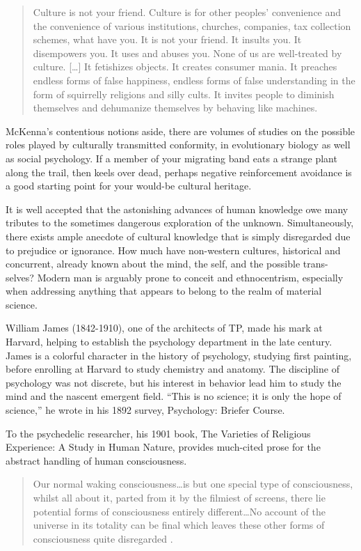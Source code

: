 \documentclass{UIdahoMastersThesis}
\begin{document}
\begin{quote}
{Culture is not your friend. Culture is for other peoples' convenience and the convenience of various institutions, churches, companies, tax collection schemes, what have you. It is not your friend. It insults you. It disempowers you. It uses and abuses you. None of us are well-treated by culture. [\ldots] It fetishizes objects. It creates consumer mania. It preaches endless forms of false happiness, endless forms of false understanding in the form of squirrelly religions and silly cults. It invites people to diminish themselves and dehumanize themselves by behaving like machines.}
\end{quote}

McKenna's contentious notions aside, there are volumes of studies on the possible roles played by culturally transmitted conformity, in evolutionary biology as well as social psychology. If a member of your migrating band eats a strange plant along the trail, then keels over dead, perhaps negative reinforcement avoidance is a good starting point for your would-be cultural heritage.

It is well accepted that the astonishing advances of human knowledge owe many tributes to the sometimes dangerous exploration of the unknown. Simultaneously, there exists ample anecdote of cultural knowledge that is simply disregarded due to prejudice or ignorance. How much have non-western cultures, historical and concurrent, already known about the mind, the self, and the possible trans-selves? Modern man is arguably prone to conceit and ethnocentrism, especially when addressing anything that appears to belong to the realm of material science.

William James (1842-1910), one of the architects of TP, made his mark at Harvard, helping to establish the psychology department in the late  century. James is a colorful character in the history of psychology, studying first painting, before enrolling at Harvard to study chemistry and anatomy. The discipline of psychology was not discrete, but his interest in behavior lead him to study the mind and the nascent emergent field. \enquote{This is no science; it is only the hope of science,} he wrote in his 1892 survey, Psychology: Briefer Course. 

To the psychedelic researcher, his 1901 book, The Varieties of Religious Experience: A Study in Human Nature, provides much-cited prose for the abstract handling of human consciousness.

\begin{quote}
{Our normal waking consciousness\ldots is but one special type of consciousness, whilst all about it, parted from it by the filmiest of screens, there lie potential forms of consciousness entirely different\ldots No account of the universe in its totality can be final which leaves these other forms of consciousness quite disregarded \cite{james1961varieties}.}
\end{quote}
\end{document}
